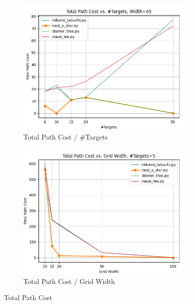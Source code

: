 \begin{figure}
\centering

\begin{subfigure}[b]{\linewidth}
    \includegraphics[width=\linewidth]{figures/plots/totalCost_areaConst.png}
    \caption{Total Path Cost / \#Targets}
\end{subfigure}
\begin{subfigure}[b]{\linewidth}
    \includegraphics[width=\linewidth]{figures/plots/totalCost_nConst.png}
    \caption{Total Path Cost / Grid Width}
\end{subfigure}

\caption{Total Path Cost}
\label{fig:totalCost}
\end{figure}

